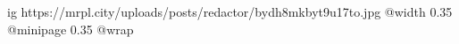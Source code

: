  
 
 
 
 

\ifcmt
  ig https://mrpl.city/uploads/posts/redactor/bydh8mkbyt9u17to.jpg
  @width 0.35
  @minipage 0.35
  @wrap \parpic[r]
\fi
